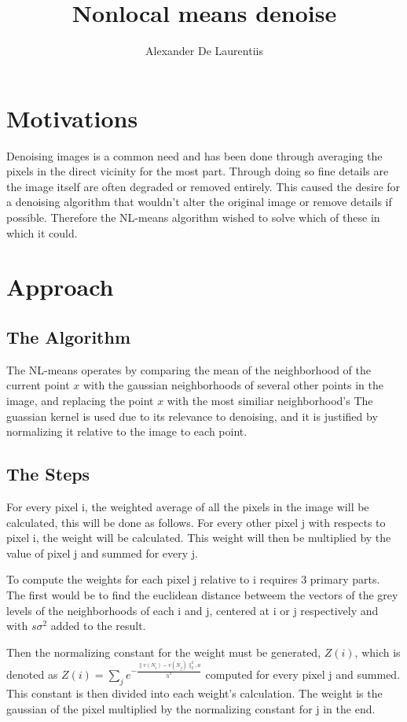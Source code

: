\documentclass[12pt, letterpaper]{article}
\title{Nonlocal means denoise}
\author{Alexander De Laurentiis}
\begin{document}
\maketitle
\pagebreak

\section{Motivations}
Denoising images is a common need and has been done through averaging the pixels in the direct vicinity for the most part. Through doing so fine details are the image itself are often degraded or removed entirely. This caused the desire for a denoising algorithm that wouldn't alter the original image or remove details if possible. Therefore the NL-means algorithm wished to solve which of these in which it could.
\section{Approach}
\subsection{The Algorithm}
The NL-means operates by comparing the mean of the neighborhood of the current point $x$ with the gaussian neighborhoods of several other points in the image, and replacing the point $x$ with the most similiar neighborhood's The guassian kernel is used due to its relevance to denoising, and it is justified by normalizing it relative to the image to each point. 

\subsection{The Steps}
For every pixel i, the weighted average of all the pixels in the image will be calculated, this will be done as follows. For every other pixel j with respects to pixel i, the weight will be calculated. This weight will then be multiplied by the value of pixel j and summed for every j.

To compute the weights for each pixel j relative to i requires 3 primary parts. The first would be to find the euclidean distance betweem the vectors of the grey levels of the neighborhoods of each i and j, centered at i or j respectively and with $s\sigma^2$ added to the result.

Then the normalizing constant for the weight must be generated, $Z(i)$, which is denoted as $Z(i) = \sum_je^{-\frac{\|v(N_i)-v(N_j)\|_2^2,a}{h^2}}$ computed for every pixel j and summed. This constant is then divided into each weight's calculation. The weight is the gaussian of the pixel multiplied by the normalizing constant for j in the end.
\end{document}
